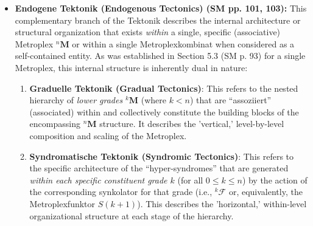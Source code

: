 \documentclass[12pt]{article}
\newcommand{\q}[1]{\enquote{#1}}
\newcommand{\metroplex}[1]{{}^{#1}\mathbf{M}}
\newcommand{\metroplexsynkolator}[1]{{}^{#1}\mathcal{F}}
\newcommand{\metroplexfunktor}{S}
\begin{document}
\begin{itemize}
    \item \textbf{Endogene Tektonik (Endogenous Tectonics) (SM pp. 101, 103):}
    This complementary branch of the Tektonik describes the internal architecture or structural organization that exists \textit{within} a single, specific (associative) Metroplex \( \metroplex{n} \) or within a single Metroplexkombinat when considered as a self-contained entity. As was established in Section 5.3 (SM p. 93) for a single Metroplex, this internal structure is inherently dual in nature:
    \begin{enumerate}
        \item \textbf{Graduelle Tektonik (Gradual Tectonics)}: This refers to the nested hierarchy of \textit{lower grades} \( \metroplex{k} \) (where \( k < n \)) that are \q{assoziiert} (associated) within and collectively constitute the building blocks of the encompassing \( \metroplex{n} \) structure. It describes the 'vertical,' level-by-level composition and scaling of the Metroplex.
        \item \textbf{Syndromatische Tektonik (Syndromic Tectonics)}: This refers to the specific architecture of the \q{hyper-syndromes} that are generated \textit{within each specific constituent grade \( k \)} (for all \( 0 \leq k \leq n \)) by the action of the corresponding synkolator for that grade (i.e., \( \metroplexsynkolator{k} \) or, equivalently, the Metroplexfunktor \( \metroplexfunktor(k+1) \)). This describes the 'horizontal,' within-level organizational structure at each stage of the hierarchy.
    \end{enumerate}


\end{itemize}
\end{document}
